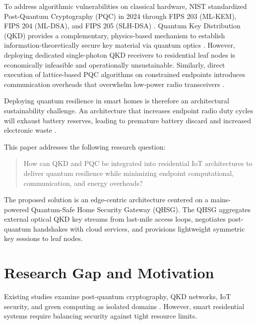 \documentclass[journal]{IEEEtran}
\begin{document}
To address algorithmic vulnerabilities on classical hardware, NIST standardized Post-Quantum
Cryptography (PQC) in 2024 through FIPS 203 (ML-KEM), FIPS 204 (ML-DSA), and FIPS 205
(SLH-DSA) \cite{nist203,nist204,nist205}. Quantum Key Distribution (QKD) provides a
complementary, physics-based mechanism to establish information-theoretically secure key
material via quantum optics \cite{bb84,scarani,pirandola,etsi}. However, deploying dedicated
single-photon QKD receivers to residential leaf nodes is economically infeasible and
operationally unsustainable. Similarly, direct execution of lattice-based PQC algorithms
on constrained endpoints introduces communication overheads that overwhelm low-power radio
transceivers \cite{kannwischer2020pqm4,alkim2016kyber}.

Deploying quantum resilience in smart homes is therefore an architectural sustainability
challenge. An architecture that increases endpoint radio duty cycles will exhaust battery
reserves, leading to premature battery discard and increased electronic waste
\cite{marcu2020lifecycle}.

This paper addresses the following research question:
\begin{quote}
How can QKD and PQC be integrated into residential IoT architectures to deliver quantum
resilience while minimizing endpoint computational, communication, and energy overheads?
\end{quote}

The proposed solution is an edge-centric architecture centered on a mains-powered
Quantum-Safe Home Security Gateway (QHSG). The QHSG aggregates external optical QKD key
streams from last-mile access loops, negotiates post-quantum handshakes with cloud services,
and provisions lightweight symmetric key sessions to leaf nodes.


\section{Research Gap and Motivation}

Existing studies examine post-quantum cryptography, QKD networks, IoT security, and green
computing as isolated domains \cite{kaur2021sustainable,campagna2020quantum}. However,
smart residential systems require balancing security against tight resource limits.
\end{document}
